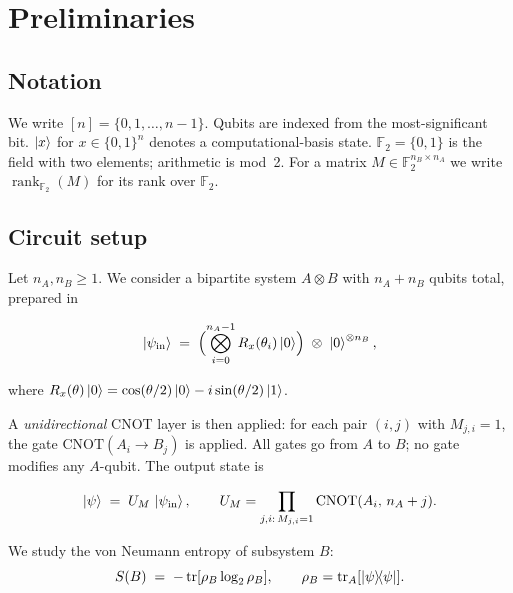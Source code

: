 \documentclass[11pt,a4paper]{article}
\newcommand{\F}{\mathbb{F}}
\newcommand{\rk}{\operatorname{rank}_{\F_2}}
\newcommand{\VNE}{S}
\begin{document}
\section{Preliminaries}
\label{sec:prelim}

\subsection{Notation}

We write $[n] = \{0,1,\dotsc,n-1\}$.
Qubits are indexed from the most-significant bit.
$\ket{x}$ for $x \in \{0,1\}^n$ denotes a computational-basis state.
$\F_2 = \{0,1\}$ is the field with two elements; arithmetic is mod~2.
For a matrix $M \in \F_2^{n_B \times n_A}$ we write $\rk(M)$ for its
rank over $\F_2$.

\subsection{Circuit setup}

Let $n_A, n_B \geq 1$.  We consider a bipartite system $A \otimes B$ with
$n_A + n_B$ qubits total, prepared in

\begin{equation}
  \ket{\psi_{\mathrm{in}}} \;=\;
  \Bigl(\bigotimes_{i=0}^{n_A-1} R_x(\theta_i)\ket{0}\Bigr)
  \;\otimes\;
  \ket{0}^{\otimes n_B},
  \label{eq:product_input}
\end{equation}

where $R_x(\theta)\ket{0} = \cos(\theta/2)\ket{0} - i\sin(\theta/2)\ket{1}$.

A \emph{unidirectional} CNOT layer is then applied: for each pair $(i,j)$ with
$M_{j,i}=1$, the gate $\mathrm{CNOT}(A_i \to B_j)$ is applied.  All gates go
from $A$ to $B$; no gate modifies any $A$-qubit.  The output state is

\begin{equation}
  \ket{\psi} \;=\; U_M \,\ket{\psi_{\mathrm{in}}},
  \qquad
  U_M = \prod_{j,i:\, M_{j,i}=1} \mathrm{CNOT}(A_i,\, n_A + j).
  \label{eq:circuit}
\end{equation}

We study the von Neumann entropy of subsystem $B$:
\begin{equation}
  \VNE(B) \;=\; -\tr[\rho_B \log_2 \rho_B],
  \qquad \rho_B = \tr_A[\ketbra{\psi}{\psi}].
\end{equation}

\end{document}
